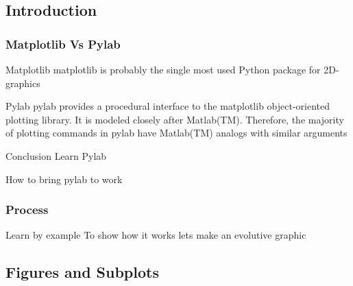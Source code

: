 \documentclass[colorlinks]{beamer}
\begin{document}
\subsection{Introduction}
\begin{frame}[fragile]\frametitle{Matplotlib Vs Pylab}
\begin{block}{Matplotlib}
\tiny
matplotlib is probably the single most used Python package for 2D-graphics
\end{block}
\begin{block}{Pylab}
\tiny
pylab provides a procedural interface to the matplotlib object-oriented plotting library. It is modeled closely after Matlab(TM). Therefore, the majority of plotting commands in pylab have Matlab(TM) analogs with similar arguments
\end{block}
\begin{block}{Conclusion}
\tiny
Learn Pylab
\end{block}
\begin{block}{How to bring pylab to work}
\tiny
{}

\end{block}


\end{frame}

\begin{frame}[fragile]\frametitle{Process}
\begin{block}{Learn by example}
To show how it works lets make an evolutive graphic
\end{block}

\end{frame}



\subsection{Figures and Subplots}
\end{document}
